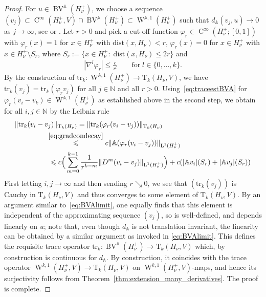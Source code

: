 \documentclass[a4paper,10pt]{amsart}
\renewcommand{\leq}{\leqslant}
\newcommand{\lebe}{\operatorname{L}}
\newcommand{\sobo}{\operatorname{W}}
\newcommand{\hold}{\operatorname{C}}
\newcommand{\bv}{\operatorname{BV}}
\newcommand{\A}{\mathbb{A}}
\numberwithin{equation}{section}
\theoremstyle{remark}
\numberwithin{equation}{section}
\begin{document}
\begin{proof}
		For $u\in\bv^{\A}(H_{\nu}^{+})$, we choose a sequence $(v_{j})\subset \hold^{\infty}(H_{\nu}^{+},V)\cap\bv^{\A}(H_{\nu}^{+})\subset\sobo^{\A,1}(H_{\nu}^{+})$ such that $d_{\A}(v_{j},u)\to 0$ as $j\to\infty$, see \cite[Sec. 2.4]{BDG} or \cite[Sec. 2.3]{RS}. Let $r>0$ and pick a cut-off function $\varphi_{r}\in\hold^{\infty}(H_{\nu}^{+};[0,1])$ with $\varphi_{r}(x)=1$ for $x\in H_{\nu}^{+}$ with $\mathrm{dist}(x,H_{\nu})<r$, $\varphi_{r}(x)=0$ for $x\in H_{\nu}^{+}$ with $x\in H_{\nu}^{+}\setminus S_{r}$, where $S_{r}:=\{x\in H_{\nu}^{+}\colon\;\mathrm{dist}(x,H_{\nu})\leq 2r\}$ and 
		\begin{align}\label{eq:gradcondecay}		
			|\nabla^{l}\varphi_{r}|\leq\frac{c}{r^{l}}\qquad\text{for}\; l\in\{0,...,k\}.
		\end{align}
		By the construction of $\mathrm{tr}_{k}\colon\sobo^{\A,1}(H_{\nu}^{+})\to\mathrm{T}_{k}(H_{\nu},V)$, we have $\mathrm{tr}_{k}(v_{j})=\mathrm{tr}_{k}(\varphi_{r}v_{j})$ for all $j\in\mathbb{N}$ and all $r>0$. Using~\eqref{eq:traceestBVA} for $\varphi_{r}(v_{i}-v_{k})\in\sobo^{\A,1}(H_{\nu}^{+})$ as established above in the second step, we obtain for all $i,j\in\mathbb{N}$ by the Leibniz rule 
		\begin{align}\label{eq:BVAlimit}
			\begin{split}
				\|\mathrm{tr}_{k}(v_{i}-v_{j})\|_{\mathrm{T}_{k}(H_{\nu})} & = \|\mathrm{tr}_{k}(\varphi_{r}(v_{i}-v_{j}))\|_{\mathrm{T}_{k}(H_{\nu})} \\ 
				& \!\!\!\!\!\!\!\!\!\!\!\!\!\!\!\!\!\!\!\!\!\!\!\!\!\!\stackrel{\eqref{eq:gradcondecay}}{\leq} c\|\A(\varphi_{r}(v_{i}-v_{j}))\|_{\lebe^{1}(H_{\nu}^{+})}\\ 
				& \!\!\!\!\!\!\!\!\!\!\!\!\!\!\!\!\!\!\!\!\!\!\!\!\leq c\Big(\sum_{m=0}^{k-1}\frac{1}{r^{k-m}}\|D^{m}(v_{i}-v_{j})\|_{\lebe^{1}(H_{\nu}^{+})} \Big) + c(|\A v_{i}|(S_{r})+|\A v_{j}|(S_{r}))
			\end{split}
		\end{align}
		First letting $i,j\to\infty$ and then sending $r\searrow 0$, we see that $(\mathrm{tr}_{k}(v_{j}))$ is Cauchy in $\mathrm{T}_{k}(H_{\nu},V)$ and thus converges to some element of $\mathrm{T}_{k}(H_{\nu},V)$. By an argument similar to~\eqref{eq:BVAlimit}, one equally finds that this element is independent of the approximating sequence $(v_{j})$, so is well-defined, and depends linearly on $u$; note that, even though $d_{\A}$ is not translation invariant, the linearity can be obtained by a similar argument as invoked in \eqref{eq:BVAlimit}. This defines the requisite trace operator $\mathrm{tr}_{k}\colon\bv^{\A}(H_{\nu}^{+})\to\mathrm{T}_{k}(H_{\nu},V)$ which, by construction is continuous for $d_{\A}$. By construction, it coincides with the trace operator $\sobo^{k,1}(H_{\nu}^{+},V)\to\mathrm{T}_{k}(H_{\nu},V)$ on $\sobo^{k,1}(H_{\nu}^{+},V)$-maps, and hence its surjectivity follows from Theorem~\ref{thm:extension_many_derivatives}. The proof is complete. 
	\end{proof}
	
\end{document}
